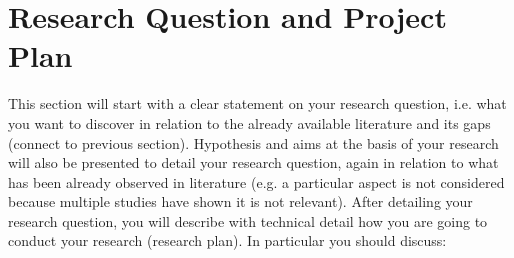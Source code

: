 \section{Research Question and Project Plan}

This section will start with a clear statement on your research question, i.e. what you want to discover in relation to the already available literature and its gaps (connect to previous section). Hypothesis and aims at the basis of your research will also be presented to detail your research question, again in relation to what has been already observed in literature (e.g. a particular aspect is not considered because multiple studies have shown it is not relevant). After detailing your research question, you will describe with technical detail how you are going to conduct your research (research plan). In particular you should discuss:

